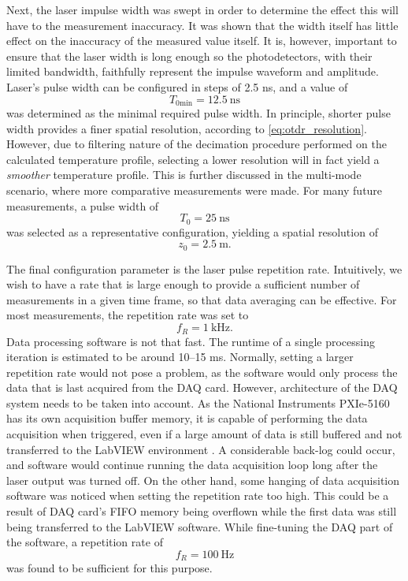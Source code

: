 \documentclass{standalone}
\begin{document}
Next, the laser impulse width was swept in order to determine the effect this will have to the measurement inaccuracy. It was shown that the width itself has little effect on the inaccuracy of the measured value itself. It is, however, important to ensure that the laser width is long enough so the photodetectors, with their limited bandwidth, faithfully represent the impulse waveform and amplitude. Laser's pulse width can be configured in steps of 2.5 ns, and a value of
\begin{equation}
T_{0\textrm{min}} = \SI{12.5}{\nano \second}
\end{equation}
was determined as the minimal required pulse width. In principle, shorter pulse width provides a finer spatial resolution, according to \ref{eq:otdr_resolution}. However, due to filtering nature of the decimation procedure performed on the calculated temperature profile, selecting a lower resolution will in fact yield a \textit{smoother} temperature profile. This is further discussed in the multi-mode scenario, where more comparative measurements were made. For many future measurements, a pulse width of
\begin{equation}
T_0 = \SI{25}{\nano \second}
\end{equation}
was selected as a representative configuration, yielding a spatial resolution of
\begin{equation}
z_0 = \SI{2.5}{\meter} \textrm{.}
\end{equation}

The final configuration parameter is the laser pulse repetition rate. Intuitively, we wish to have a rate that is large enough to provide a sufficient number of measurements in a given time frame, so that data averaging can be effective. For most measurements, the repetition rate was set to
\begin{equation}
f_R = \SI{1}{\kilo \hertz} \textrm{.}
\end{equation}
Data processing software is not that fast. The runtime of a single processing iteration is estimated to be around 10--15 ms. Normally, setting a larger repetition rate would not pose a problem, as the software would only process the data that is last acquired from the DAQ card. However, architecture of the DAQ system needs to be taken into account. As the National Instruments PXIe-5160 has its own acquisition buffer memory, it is capable of performing the data acquisition when triggered, even if a large amount of data is still buffered and not transferred to the LabVIEW environment \cite{datasheet:daq}\cite{labview:niscope}. A considerable back-log could occur, and software would continue running the data acquisition loop long after the laser output was turned off. On the other hand, some hanging of data acquisition software was noticed when setting the repetition rate too high. This could be a result of DAQ card's FIFO memory being overflown while the first data was still being transferred to the LabVIEW software. While fine-tuning the DAQ part of the software, a repetition rate of
\begin{equation}
f_R = \SI{100}{\hertz}
\end{equation}
was found to be sufficient for this purpose. \\
\end{document}

